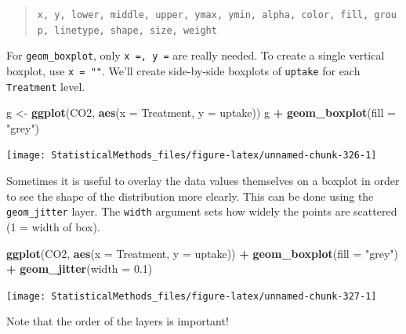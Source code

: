 \documentclass[
]{book}
\newenvironment{Shaded}{\begin{snugshade}}{\end{snugshade}}
\newcommand{\DataTypeTok}[1]{\textcolor[rgb]{0.13,0.29,0.53}{#1}}
\newcommand{\FloatTok}[1]{\textcolor[rgb]{0.00,0.00,0.81}{#1}}
\newcommand{\KeywordTok}[1]{\textcolor[rgb]{0.13,0.29,0.53}{\textbf{#1}}}
\newcommand{\NormalTok}[1]{#1}
\newcommand{\OperatorTok}[1]{\textcolor[rgb]{0.81,0.36,0.00}{\textbf{#1}}}
\newcommand{\StringTok}[1]{\textcolor[rgb]{0.31,0.60,0.02}{#1}}
\theoremstyle{definition}
\theoremstyle{definition}
\theoremstyle{definition}
\theoremstyle{remark}
\begin{document}
\begin{quote}
\texttt{x,\ y,\ lower,\ middle,\ upper,\ ymax,\ ymin,\ alpha,\ color,\ fill,\ group,\ linetype,\ shape,\ size,\ weight}
\end{quote}

For \texttt{geom\_boxplot}, only \texttt{x\ =,\ y\ =} are really needed. To create a single vertical boxplot, use \texttt{x\ =\ ""}. We'll create side-by-side boxplots of \texttt{uptake} for each \texttt{Treatment} level.

\begin{Shaded}
\begin{Highlighting}[]
\NormalTok{g <-}\StringTok{ }\KeywordTok{ggplot}\NormalTok{(CO2, }\KeywordTok{aes}\NormalTok{(}\DataTypeTok{x =}\NormalTok{ Treatment, }\DataTypeTok{y =}\NormalTok{ uptake))}
\NormalTok{g }\OperatorTok{+}\StringTok{ }\KeywordTok{geom_boxplot}\NormalTok{(}\DataTypeTok{fill =} \StringTok{"grey"}\NormalTok{)}
\end{Highlighting}
\end{Shaded}

\begin{center}\texttt{[image: StatisticalMethods\_files/figure-latex/unnamed-chunk-326-1]} \end{center}

Sometimes it is useful to overlay the data values themselves on a boxplot in order to see the shape of the distribution more clearly. This can be done using the \texttt{geom\_jitter} layer. The \texttt{width} argument sets how widely the points are scattered (1 = width of box).

\begin{Shaded}
\begin{Highlighting}[]
\KeywordTok{ggplot}\NormalTok{(CO2, }\KeywordTok{aes}\NormalTok{(}\DataTypeTok{x =}\NormalTok{ Treatment, }\DataTypeTok{y =}\NormalTok{ uptake)) }\OperatorTok{+}\StringTok{ }
\StringTok{  }\KeywordTok{geom_boxplot}\NormalTok{(}\DataTypeTok{fill =} \StringTok{"grey"}\NormalTok{) }\OperatorTok{+}
\StringTok{  }\KeywordTok{geom_jitter}\NormalTok{(}\DataTypeTok{width =} \FloatTok{0.1}\NormalTok{)}
\end{Highlighting}
\end{Shaded}

\begin{center}\texttt{[image: StatisticalMethods\_files/figure-latex/unnamed-chunk-327-1]} \end{center}

Note that the order of the layers is important!
\end{document}
